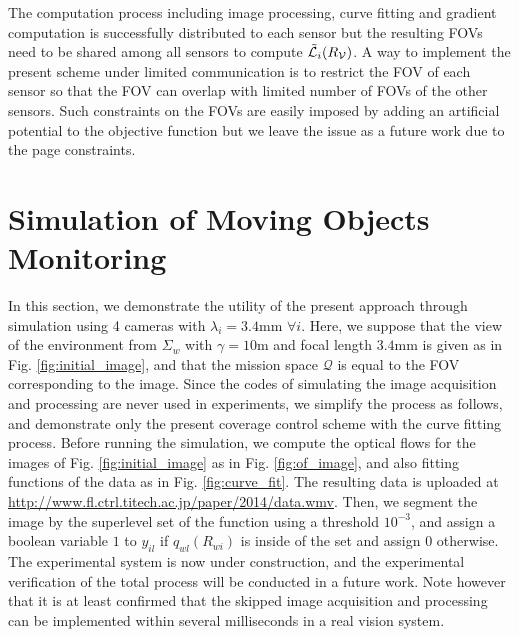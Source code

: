 \documentclass[conference,letterpaper]{ieeeconf}
\newcommand{\V}{{\mathcal V}}
\newcommand{\Q}{{\mathcal Q}}
\newcommand{\ewi}{R_{wi}}
\renewcommand{\L}{{\cal L}}
\begin{document}
The computation process including image processing, 
curve fitting and gradient computation
is successfully distributed to each sensor but the resulting FOVs need to be shared
among all sensors to compute $\tilde \L_i(R_{\V})$.
A way to implement the present scheme under 
limited communication
is to restrict the FOV of each sensor so that the FOV can overlap
with limited number of FOVs of the other sensors.
Such constraints on the FOVs are easily imposed by adding
an artificial potential to the objective function but 
 we leave the issue as a future work due to the page constraints.










\section{Simulation of Moving Objects Monitoring}



In this section, we demonstrate the utility of the
present approach through simulation using 4 cameras with $\lambda_i = 3.4$mm ${\forall i}$.
Here, we suppose that the view of the environment from $\Sigma_w$ with $\gamma = 10$m and focal length 
$3.4$mm is given as in 
Fig. \ref{fig:initial_image},
and that the mission space $\Q$ is equal to the FOV corresponding to the image.
Since the codes of simulating the image acquisition and processing are never used in experiments,
we simplify the process as follows, and demonstrate only the present coverage control scheme 
with the curve fitting process.
Before running the simulation, we compute the optical flows
for the images of Fig. \ref{fig:initial_image} as in Fig. \ref{fig:of_image},
and also fitting functions of the data as in Fig. \ref{fig:curve_fit}.
The resulting data is uploaded at
\url{http://www.fl.ctrl.titech.ac.jp/paper/2014/data.wmv}.
Then, we segment the image by the superlevel set
of the function using a threshold $10^{-3}$,
and assign a boolean variable $1$ to $y_{il}$ if 
$q_{wl}(\ewi)$ is inside of the set and assign $0$ otherwise.
The experimental system is now under construction, and the
experimental verification of the total process
will be conducted in a future work.
Note however that it is at least confirmed that 
the skipped image acquisition and processing 
can be implemented within several milliseconds in a real vision system.
\end{document}
